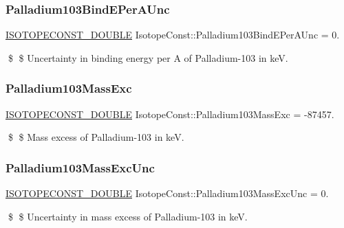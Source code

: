 \subsubsection{\texorpdfstring{Palladium103\+Bind\+E\+Per\+A\+Unc}{Palladium103BindEPerAUnc}}
{\footnotesize\ttfamily \mbox{\hyperlink{group___isotope_const-_macros_ga8f45a7272ce02c0b4c65c44636ed719a}{I\+S\+O\+T\+O\+P\+E\+C\+O\+N\+S\+T\+\_\+\+D\+O\+U\+B\+LE}} Isotope\+Const\+::\+Palladium103\+Bind\+E\+Per\+A\+Unc = 0.}

\$ \$ Uncertainty in binding energy per A of Palladium-\/103 in keV. \mbox{\label{group___isotope_const-_palladium-_pd103_gaadfae900e1c7ce5c05b25b5b94c5bb5f}} 
\subsubsection{\texorpdfstring{Palladium103\+Mass\+Exc}{Palladium103MassExc}}
{\footnotesize\ttfamily \mbox{\hyperlink{group___isotope_const-_macros_ga8f45a7272ce02c0b4c65c44636ed719a}{I\+S\+O\+T\+O\+P\+E\+C\+O\+N\+S\+T\+\_\+\+D\+O\+U\+B\+LE}} Isotope\+Const\+::\+Palladium103\+Mass\+Exc = -\/87457.}

\$ \$ Mass excess of Palladium-\/103 in keV. \mbox{\label{group___isotope_const-_palladium-_pd103_ga5643184b737ae4d053001e8063f788d3}} 
\subsubsection{\texorpdfstring{Palladium103\+Mass\+Exc\+Unc}{Palladium103MassExcUnc}}
{\footnotesize\ttfamily \mbox{\hyperlink{group___isotope_const-_macros_ga8f45a7272ce02c0b4c65c44636ed719a}{I\+S\+O\+T\+O\+P\+E\+C\+O\+N\+S\+T\+\_\+\+D\+O\+U\+B\+LE}} Isotope\+Const\+::\+Palladium103\+Mass\+Exc\+Unc = 0.}

\$ \$ Uncertainty in mass excess of Palladium-\/103 in keV. \mbox{\label{group___isotope_const-_palladium-_pd103_ga1262930646c466a730f81e6f581fafa9}} 
